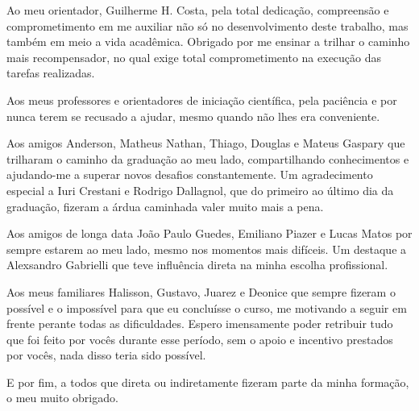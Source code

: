 %


   \begin{agradecimentos}
    Ao meu orientador, Guilherme H. Costa, pela total dedicação, compreensão e comprometimento em me auxiliar não só no desenvolvimento deste trabalho, mas também em meio a vida acadêmica. Obrigado por me ensinar a trilhar o caminho mais recompensador, no qual exige total comprometimento na execução das tarefas realizadas.
    
    Aos meus professores e orientadores de iniciação científica, pela paciência e por nunca terem se recusado a ajudar, mesmo quando não lhes era conveniente.
    
    Aos amigos Anderson, Matheus Nathan, Thiago, Douglas e Mateus Gaspary que trilharam o caminho da graduação ao meu lado, compartilhando conhecimentos e ajudando-me a superar novos desafios constantemente. Um agradecimento especial a Iuri Crestani e Rodrigo Dallagnol, que do primeiro ao último dia da graduação, fizeram a árdua caminhada valer muito mais a pena.
    
    Aos amigos de longa data João Paulo Guedes, Emiliano Piazer e Lucas Matos por sempre estarem ao meu lado, mesmo nos momentos mais difíceis. Um destaque a Alexsandro Gabrielli que teve influência direta na minha escolha profissional.
    
    Aos meus familiares Halisson, Gustavo, Juarez e Deonice que sempre fizeram o possível e o impossível para que eu concluísse o curso, me motivando a seguir em frente perante todas as dificuldades. Espero imensamente poder retribuir tudo que foi feito por vocês durante esse período, sem o apoio e incentivo prestados por vocês, nada disso teria sido possível.
    
    E por fim, a todos que direta ou indiretamente fizeram parte da minha formação, o meu
    muito obrigado.
   \end{agradecimentos}

